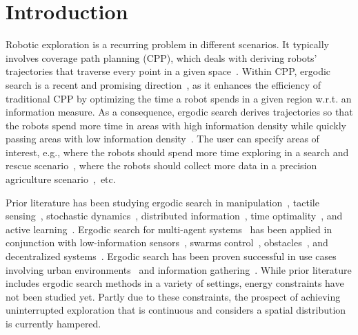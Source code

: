 \documentclass[letterpaper,10pt,conference,twoside]{IEEEtran}
\theoremstyle{definition}
\begin{document}
\section{Introduction}
\noindent
Robotic exploration is a recurring problem in different scenarios. It typically involves coverage path planning (CPP), which deals with deriving robots' trajectories that traverse every point in a given space~\cite{choset2001coverage,galceran2013survey,cabreira2019survey}. Within CPP, ergodic search is a recent and promising direction~\cite{abraham2021ergodic,miller2016ergodic,dressel2018optimality,torre2016ergodic,shetty2022ergodic,prabhakar2020ergodic,coffin2022multi,lerch2023safety,abraham2018decentralized,patel2021multi,dong2023time,abraham2017ergodic,rao2023multi,ayvali2017ergodic}, as it enhances the efficiency of traditional CPP by optimizing the time a robot spends in a given region w.r.t. an information measure. As a consequence, ergodic search derives trajectories so that the robots spend more time in areas with high information density while quickly passing areas with low information density~\cite{mathew2011metrics,%
patel2021multi}. The user can specify areas of interest, e.g., where the robots should spend more time exploring in a search and rescue scenario~\cite{dong2023time}, where the robots should collect more data in a precision agriculture scenario~\cite{rao2023multi},~etc.

Prior literature has been studying ergodic search in manipulation~\cite{shetty2022ergodic}, tactile sensing~\cite{abraham2017ergodic}, stochastic dynamics~\cite{ayvali2017ergodic,torre2016ergodic}, distributed information~\cite{miller2016ergodic}, time optimality~\cite{dong2023time}, and active learning~\cite{abraham2021ergodic}. Ergodic search for multi-agent systems~\cite{prabhakar2020ergodic,coffin2022multi} has been applied in conjunction with low-information sensors~\cite{coffin2022multi,lerch2023safety,abraham2018decentralized}, swarms control~\cite{prabhakar2020ergodic}, obstacles~\cite{lerch2023safety}, and decentralized systems~\cite{abraham2018decentralized}. Ergodic search has been proven successful in use cases involving urban environments~\cite{patel2021multi} and information gathering~\cite{dressel2018optimality}.
While prior literature includes ergodic search methods in a variety of settings, energy constraints have not been studied yet. Partly due to these constraints, the prospect of achieving uninterrupted exploration that is continuous and considers a spatial distribution is currently hampered. 
\end{document}
